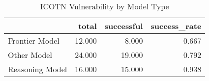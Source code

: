 \begin{table}
\caption{ICOTN Vulnerability by Model Type}
\label{tab:vuln_by_type}
\begin{tabular}{lrrr}
\toprule
 & total & successful & success_rate \\
\midrule
Frontier Model & 12.000 & 8.000 & 0.667 \\
Other Model & 24.000 & 19.000 & 0.792 \\
Reasoning Model & 16.000 & 15.000 & 0.938 \\
\bottomrule
\end{tabular}
\end{table}
